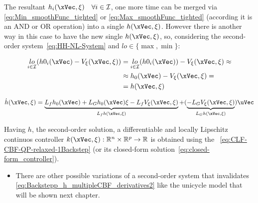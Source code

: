 The resultant  \(h_i(\xVec, \mathbf{\xi}) \quad \forall i \in \mathcal{I}\), one more time can be merged via \ref{eq:Min_smoothFunc_tighted} or \ref{eq:Max_smoothFunc_tighted} (according it is an AND or OR operation) into a single  \(h(\xVec, \mathbf{\xi})\). However there is another way in this case to have the new single  \(h(\xVec, \mathbf{\xi})\), so, considering the second-order system~\ref{eq:HH-NL-System} and \(lo \in \{\max, \min\}\):

\begin{align}
        \underset{ i \in \mathcal{I}}{lo}(h0_i(\xVec) - V_{\mathbf{\xi}}(\xVec, \mathbf{\xi})) &= \underset{ i \in \mathcal{I}}{lo}(h0_i(\xVec)) - V_{\mathbf{\xi}}(\xVec, \mathbf{\xi}) \approx 
                                                                                                \notag\\
                                                                                               &\approx h_0(\xVec) - V_{\mathbf{\xi}}(\xVec, \mathbf{\xi}) = 
                                                                                               \notag\\
                                                                                               &=h(\xVec, \mathbf{\xi})
                                                                                               \label{eq:Backstepp_h_multipleCBF2}
\end{align}

\begin{equation}
        \dot{h}(\xVec, \mathbf{\xi}) = \underbrace{L_fh_0(\xVec) + L_Gh_0(\xVec)\mathbf{\xi} - L_fV_{\mathbf{\xi}}(\xVec, \mathbf{\xi})}_{L_fh(\xVec, \mathbf{\xi})} + (\underbrace{- L_GV_{\mathbf{\xi}}(\xVec, \mathbf{\xi})}_{L_Gh(\xVec, \mathbf{\xi})}) \uVec
        \label{eq:Backstepp_h_multipleCBF_derivatives2}
\end{equation}


Having  \(h\), the second-order solution, a differentiable and locally Lipschitz continuos controller \(k(\xVec, \mathbf{\xi}): \mathbb{R}^n \times \mathbb{R}^p \to \mathbb{R}\) is obtained using the ~\ref{eq:CLF-CBF-QP-relaxed-1Backstep} (or its closed-form solution~\ref{eq:closed-form_controller}). \\

\begin{tcolorbox}[colback=blue!5!white,colframe=blue!35!white,title=Notes:]
\begin{itemize}
    \item There are other possible variations of a second-order system that invalidates \ref{eq:Backstepp_h_multipleCBF_derivatives2} like the unicycle model that will be shown next chapter.
\end{itemize}
\end{tcolorbox} 



